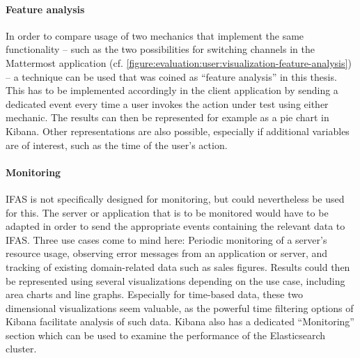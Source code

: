 \paragraph{Feature analysis}
In order to compare usage of two mechanics that implement the same functionality -- such as the two possibilities for switching channels in the Mattermost application (cf. \cref{figure:evaluation:user:visualization-feature-analysis}) -- a technique can be used that was coined as ``feature analysis'' in this thesis.
This has to be implemented accordingly in the client application by sending a dedicated event every time a user invokes the action under test using either mechanic.
The results can then be represented for example as a pie chart in Kibana.
Other representations are also possible, especially if additional variables are of interest, such as the time of the user's action.

\paragraph{Monitoring}
\ac{IFAS} is not specifically designed for monitoring, but could nevertheless be used for this.
The server or application that is to be monitored would have to be adapted in order to send the appropriate events containing the relevant data to \ac{IFAS}.
Three use cases come to mind here: Periodic monitoring of a server's resource usage, observing error messages from an application or server, and tracking of existing domain-related data such as sales figures.
Results could then be represented using several visualizations depending on the use case, including area charts and line graphs.
Especially for time-based data, these two dimensional visualizations seem valuable, as the powerful time filtering options of Kibana facilitate analysis of such data.
Kibana also has a dedicated ``Monitoring'' section which can be used to examine the performance of the Elasticsearch cluster.

